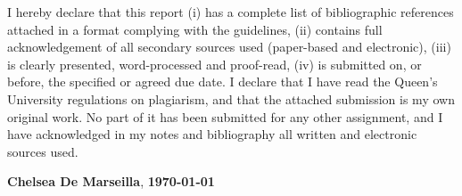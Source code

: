 {
I hereby declare that this report (i) has a complete list of bibliographic references attached in a format complying with the guidelines, (ii) contains full acknowledgement of all secondary sources used (paper-based and electronic), (iii) is clearly presented, word-processed and proof-read, (iv) is submitted on, or before, the specified or agreed due date. I declare that I have read the Queen's University regulations on plagiarism, and that the attached submission is my own original work.  No part of it has been submitted for any other assignment, and I have acknowledged in my notes and bibliography all written and electronic sources used.
}
\vspace{0.5cm}
    
\noindent{}
    \textbf{Chelsea De Marseilla},
    \textbf{\today}

